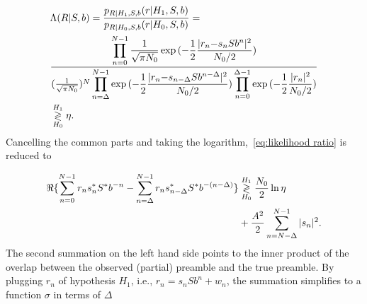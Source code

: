 \begin{equation}
    \label{eq:likelihood ratio}
    \begin{aligned}
    &\Lambda(R|S,b)=\frac{p_{R|H_1,S,b}(r|H_1,S,b)}{p_{R|H_0,S,b}(r|H_0,S,b)}= \\
    &\frac{\displaystyle \prod_{n=0}^{N-1}\frac{1}{\sqrt{\pi N_0}}\exp{(-\frac{1}{2}\frac{|r_{n}{-}s_nSb^n|^2}{N_0/2})}}
    {(\frac{1}{\sqrt{\pi N_0}})^N\displaystyle \prod_{n=\Delta}^{N-1}\exp{(-\frac{1}{2}\frac{|r_{n}{-}s_{n-\Delta}Sb^{n-\Delta}|^2}{N_0/2})} 
    \displaystyle \prod_{n=0}^{\Delta-1}\exp{(-\frac{1}{2}\frac{|r_n|^2}{N_0/2})}} \\
    &\mathrel{\mathop\gtrless\limits^{H_1}_{H_0}} \eta.
    \end{aligned}
\end{equation}
Cancelling the common parts and taking the logarithm,~\eqref{eq:likelihood ratio} is reduced to

\begin{equation}
    \label{eq:log likelihood}
    \begin{aligned}
    \Re\{\sum_{n=0}^{N-1}r_{n}s^*_nS^*b^{-n}-
    \sum_{n=\Delta}^{N-1}r_{n}s^*_{n-\Delta}S^*b^{-(n-\Delta)}\}
    &\mathrel{\mathop\gtrless\limits^{H_1}_{H_0}} \frac{N_0}{2}\ln\eta \\
    &+\frac{A^2}{2}\sum_{n=N-\Delta}^{N-1}|s_n|^2.
    \end{aligned}
\end{equation}
The second summation on the left hand side points to the inner product of the overlap between
the observed (partial) preamble and the true preamble. 
By plugging $r_{n}$ of hypothesis $H_1$, i.e., $r_{n}=s_nSb^n+w_n$, the summation simplifies 
to a function $\sigma$ in terms of $\Delta$

